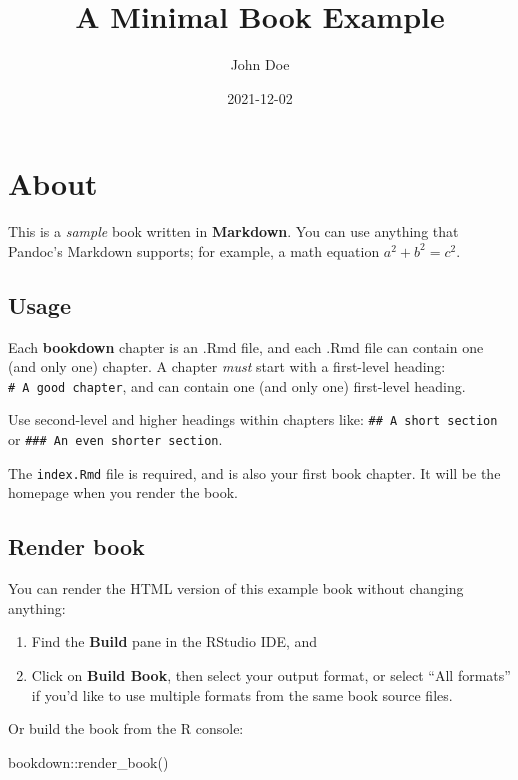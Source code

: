 \documentclass[
]{book}
\title{A Minimal Book Example}
\author{John Doe}
\date{2021-12-02}
\newenvironment{Shaded}{\begin{snugshade}}{\end{snugshade}}
\newcommand{\FunctionTok}[1]{\textcolor[rgb]{0.00,0.00,0.00}{#1}}
\newcommand{\NormalTok}[1]{#1}
\newcommand{\SpecialCharTok}[1]{\textcolor[rgb]{0.00,0.00,0.00}{#1}}
\begin{document}
\maketitle

{
\setcounter{tocdepth}{1}
\tableofcontents
}
\hypertarget{about}{%
\chapter{About}\label{about}}

This is a \emph{sample} book written in \textbf{Markdown}. You can use anything that Pandoc's Markdown supports; for example, a math equation \(a^2 + b^2 = c^2\).

\hypertarget{usage}{%
\section{Usage}\label{usage}}

Each \textbf{bookdown} chapter is an .Rmd file, and each .Rmd file can contain one (and only one) chapter. A chapter \emph{must} start with a first-level heading: \texttt{\#\ A\ good\ chapter}, and can contain one (and only one) first-level heading.

Use second-level and higher headings within chapters like: \texttt{\#\#\ A\ short\ section} or \texttt{\#\#\#\ An\ even\ shorter\ section}.

The \texttt{index.Rmd} file is required, and is also your first book chapter. It will be the homepage when you render the book.

\hypertarget{render-book}{%
\section{Render book}\label{render-book}}

You can render the HTML version of this example book without changing anything:

\begin{enumerate}
\def\labelenumi{\arabic{enumi}.}
\item
  Find the \textbf{Build} pane in the RStudio IDE, and
\item
  Click on \textbf{Build Book}, then select your output format, or select ``All formats'' if you'd like to use multiple formats from the same book source files.
\end{enumerate}

Or build the book from the R console:

\begin{Shaded}
\begin{Highlighting}[]
\NormalTok{bookdown}\SpecialCharTok{::}\FunctionTok{render\_book}\NormalTok{()}
\end{Highlighting}
\end{Shaded}
\end{document}
